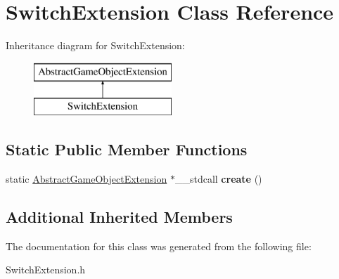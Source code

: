 \hypertarget{class_switch_extension}{}\section{Switch\+Extension Class Reference}
\label{class_switch_extension}
Inheritance diagram for Switch\+Extension\+:\begin{figure}[H]
\begin{center}
\leavevmode
\includegraphics[height=2.000000cm]{class_switch_extension}
\end{center}
\end{figure}
\subsection*{Static Public Member Functions}
\begin{DoxyCompactItemize}
\item 
\mbox{\label{class_switch_extension_a501414effe086fa4ceb039939717dd24}} 
static \mbox{\hyperlink{class_abstract_game_object_extension}{Abstract\+Game\+Object\+Extension}} $\ast$\+\_\+\+\_\+stdcall {\bfseries create} ()
\end{DoxyCompactItemize}
\subsection*{Additional Inherited Members}


The documentation for this class was generated from the following file\+:\begin{DoxyCompactItemize}
\item 
Switch\+Extension.\+h\end{DoxyCompactItemize}
